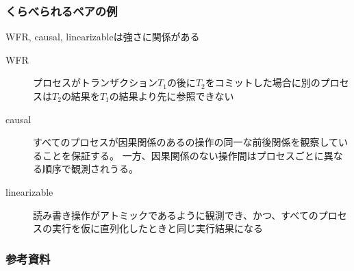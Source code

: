 \documentclass[unicode, 14pt, aspectratio=169]{beamer}
\begin{document}
\begin{frame}
  \frametitle{くらべられるペアの例}
  {\large WFR, causal, linearizableは強さに関係がある}
  \begin{description}
  \item[WFR] プロセスがトランザクション$T_1$の後に$T_2$をコミットした場合に別のプロセスは$T_2$の結果を$T_1$の結果より先に参照できない
  \item[causal] すべてのプロセスが因果関係のあるの操作の同一な前後関係を観察していることを保証する。 一方、因果関係のない操作間はプロセスごとに異なる順序で観測されうる。
  \item[linearizable] 読み書き操作がアトミックであるように観測でき、かつ、すべてのプロセスの実行を仮に直列化したときと同じ実行結果になる
  \end{description}
\end{frame}
\begin{frame}[allowframebreaks,t]
  \frametitle{参考資料}
  \printbibliography
  \nocite{*}
\end{frame}
\end{document}
